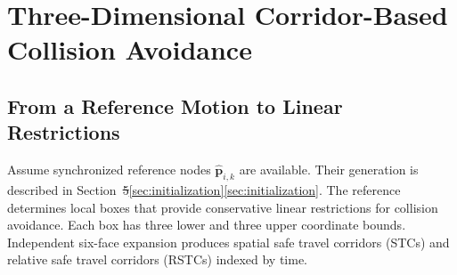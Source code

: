 \documentclass[electronics,article,submit,moreauthors]{Definitions/mdpi}
\newcommand{\bp}{\mathbf{p}}
\providecommand{\DIFadd}[1]{{\protect\color{RevisionBlue}\ifmmode #1\else\uline{#1}\fi}} %
\providecommand{\DIFdel}[1]{{\protect\color{RevisionRed}\ifmmode\text{\sout{\ensuremath{#1}}}\else\sout{#1}\fi}} %
\providecommand{\DIFaddbegin}{}\providecommand{\DIFaddend}{} %
\providecommand{\DIFdelbegin}{}\providecommand{\DIFdelend}{} %
\begin{document}
\section{Three-Dimensional Corridor-Based Collision Avoidance}

\label{sec:corridor}

\subsection{From a Reference Motion to Linear Restrictions}

Assume synchronized reference nodes $\widehat{\bp}_{i,k}$ are available. Their generation is described in Section~\DIFdelbegin \DIFdel{\mbox{5}}\DIFdelend \DIFaddbegin \DIFadd{\ref{sec:initialization}}\DIFaddend . The reference determines local boxes that provide conservative linear restrictions for collision avoidance. Each box has three lower and three upper coordinate bounds. Independent six-face expansion produces spatial safe travel corridors (STCs) and relative safe travel corridors (RSTCs) indexed by time.
\end{document}
